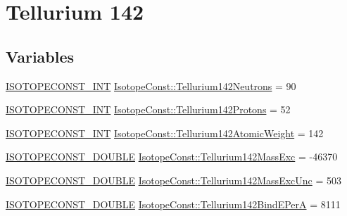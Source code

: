 \hypertarget{group___isotope_const-_tellurium-_te142}{}\section{Tellurium 142}
\label{group___isotope_const-_tellurium-_te142}
\subsection*{Variables}
\begin{DoxyCompactItemize}
\item 
\mbox{\hyperlink{group___isotope_const-_macros_ga5f18360b3e99483a35c32d789e62621c}{I\+S\+O\+T\+O\+P\+E\+C\+O\+N\+S\+T\+\_\+\+I\+NT}} \mbox{\hyperlink{group___isotope_const-_tellurium-_te142_ga67472203defa7bac6713ce1dfcca6238}{Isotope\+Const\+::\+Tellurium142\+Neutrons}} = 90
\item 
\mbox{\hyperlink{group___isotope_const-_macros_ga5f18360b3e99483a35c32d789e62621c}{I\+S\+O\+T\+O\+P\+E\+C\+O\+N\+S\+T\+\_\+\+I\+NT}} \mbox{\hyperlink{group___isotope_const-_tellurium-_te142_ga4cf2e67b69b33d52c6f02e1ae1527268}{Isotope\+Const\+::\+Tellurium142\+Protons}} = 52
\item 
\mbox{\hyperlink{group___isotope_const-_macros_ga5f18360b3e99483a35c32d789e62621c}{I\+S\+O\+T\+O\+P\+E\+C\+O\+N\+S\+T\+\_\+\+I\+NT}} \mbox{\hyperlink{group___isotope_const-_tellurium-_te142_ga1ef6e88de1ebaacd9f0fd74e1378c84a}{Isotope\+Const\+::\+Tellurium142\+Atomic\+Weight}} = 142
\item 
\mbox{\hyperlink{group___isotope_const-_macros_ga8f45a7272ce02c0b4c65c44636ed719a}{I\+S\+O\+T\+O\+P\+E\+C\+O\+N\+S\+T\+\_\+\+D\+O\+U\+B\+LE}} \mbox{\hyperlink{group___isotope_const-_tellurium-_te142_ga7467fd949e9acfbff9c1ae9396964a70}{Isotope\+Const\+::\+Tellurium142\+Mass\+Exc}} = -\/46370
\item 
\mbox{\hyperlink{group___isotope_const-_macros_ga8f45a7272ce02c0b4c65c44636ed719a}{I\+S\+O\+T\+O\+P\+E\+C\+O\+N\+S\+T\+\_\+\+D\+O\+U\+B\+LE}} \mbox{\hyperlink{group___isotope_const-_tellurium-_te142_ga778c3f23f9a65fb401e5f7ee7e37272b}{Isotope\+Const\+::\+Tellurium142\+Mass\+Exc\+Unc}} = 503
\item 
\mbox{\hyperlink{group___isotope_const-_macros_ga8f45a7272ce02c0b4c65c44636ed719a}{I\+S\+O\+T\+O\+P\+E\+C\+O\+N\+S\+T\+\_\+\+D\+O\+U\+B\+LE}} \mbox{\hyperlink{group___isotope_const-_tellurium-_te142_gaf3457e7c3f6d38fa4d0ff089f64255e4}{Isotope\+Const\+::\+Tellurium142\+Bind\+E\+PerA}} = 8111
\item 

\end{DoxyCompactItemize}
